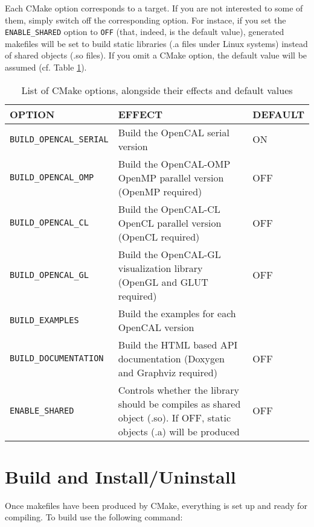Each CMake option corresponds to a target. If you are not interested
to some of them, simply switch off the corresponding option. For
instace, if you set the \verb'ENABLE_SHARED' option to \verb'OFF'
(that, indeed, is the default value), generated makefiles will be set
to build static libraries (.a files under Linux systems) instead of
shared objects (.so files). If you omit a CMake option, the default
value will be assumed (cf. Table \ref{ch:installation:cmakeoptions}).


\begin{table}[]
  \centering
  \caption{List of CMake options, alongside their effects and default
    values}
  \label{ch:installation:cmakeoptions}
  \begin{tabularx}{\textwidth}{lXl}
    \hline
    \textbf{OPTION} & \textbf{EFFECT} & \textbf{DEFAULT}\\
    \hline\hline
    \texttt{BUILD\_OPENCAL\_SERIAL} & Build the OpenCAL serial version  & ON   \\ \hline
    \texttt{BUILD\_OPENCAL\_OMP} &  Build the OpenCAL-OMP OpenMP parallel version (OpenMP required)    & OFF \\ \hline
    \texttt{BUILD\_OPENCAL\_CL} &  Build the OpenCAL-CL OpenCL parallel version (OpenCL required)     &OFF\\ \hline
    \texttt{BUILD\_OPENCAL\_GL} & Build the OpenCAL-GL visualization library (OpenGL and GLUT required)      &OFF \\ \hline
    \texttt{BUILD\_EXAMPLES} & Build the examples for each OpenCAL version      &\\ \hline
    \texttt{BUILD\_DOCUMENTATION}  &  Build the HTML based API documentation (Doxygen and Graphviz required)  & OFF   \\ \hline
    \texttt{ENABLE\_SHARED} &  Controls whether the library should be compiles as shared object (.so). If OFF, static objects (.a) will be produced & OFF\\ \hline
  \end{tabularx}
\end{table}


\section{Build and Install/Uninstall}
Once makefiles have been produced by CMake, everything is set up and
ready for compiling. To build use the following command:

